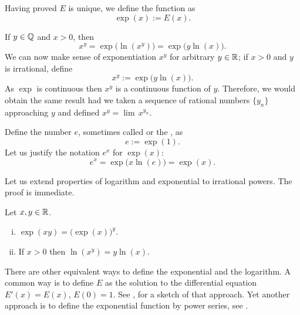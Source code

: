Having proved $E$ is unique, we define the
\emph{} function as
\begin{equation*}
\exp(x) := E(x) .
\end{equation*}

If $y \in {\mathbb{Q}}$ and $x > 0$, then
\begin{equation*}
x^y = \exp\bigl(\ln(x^y)\bigr) = \exp\bigl(y\ln(x)\bigr) .
\end{equation*}
We can now make sense of exponentiation $x^y$ for arbitrary $y \in {\mathbb{R}}$;
if $x > 0$ and $y$ is irrational, define
\begin{equation*}
x^y := \exp\bigl(y\ln(x)\bigr) .
\end{equation*}
As $\exp$ is continuous then $x^y$ is a continuous function of $y$.
Therefore, we would
obtain the same result had we taken a sequence of rational numbers $\{ y_n \}$
approaching $y$ and defined $x^y = \lim\, x^{y_n}$.

Define the number $e$,
sometimes called \emph{} or
the \emph{}, as
\begin{equation*}
e := \exp(1) .
\end{equation*}
Let us justify the notation $e^x$ for $\exp(x)$:
\begin{equation*}
e^x = \exp\bigl(x \ln(e) \bigr) = \exp(x) .
\end{equation*}

Let us extend properties of logarithm and exponential to
irrational powers.  The proof is immediate.

\begin{prop}
Let $x, y \in {\mathbb{R}}$.
\begin{enumerate}[(i)]
\item
$\exp(xy) = {\bigl(\exp(x)\bigr)}^y$.
\item
If $x > 0$ then $\ln(x^y) = y \ln (x)$.
\end{enumerate}
\end{prop}

\begin{remark}
There are other equivalent ways to define the exponential and the logarithm.
A common way is to define $E$ as the solution to the differential equation
$E'(x) = E(x)$, $E(0) = 1$.  See ,
for a sketch of that approach.  Yet another
approach is to define the exponential function by
power series, see .
\end{remark}

